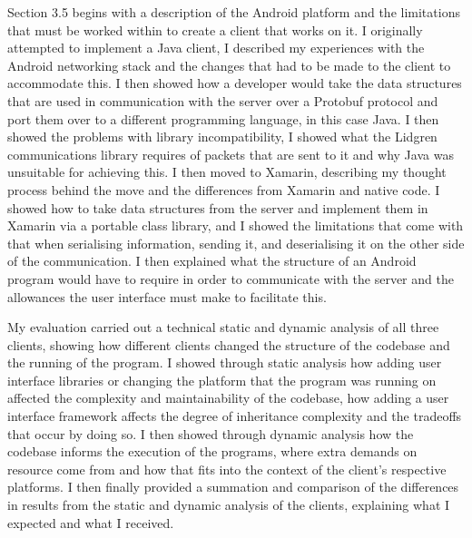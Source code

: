 \documentclass{article}
\begin{document}
Section 3.5 begins with a description of the Android platform and the limitations that must be worked within to create a client that works on it. I originally attempted to implement a Java client, I described my experiences with the Android networking stack and the changes that had to be made to the client to accommodate this. I then showed how a developer would take the data structures that are used in communication with the server over a Protobuf protocol and port them over to a different programming language, in this case Java. I then showed the problems with library incompatibility, I showed what the Lidgren communications library requires of packets that are sent to it and why Java was unsuitable for achieving this. I then moved to Xamarin, describing my thought process behind the move and the differences from Xamarin and native code. I showed how to take data structures from the server and implement them in Xamarin via a portable class library, and I showed the limitations that come with that when serialising information, sending it, and deserialising it on the other side of the communication. I then explained what the structure of an Android program would have to require in order to communicate with the server and the allowances the user interface must make to facilitate this.

My evaluation carried out a technical static and dynamic analysis of all three clients, showing how different clients changed the structure of the codebase and the running of the program. I showed through static analysis how adding user interface libraries or changing the platform that the program was running on affected the complexity and maintainability of the codebase, how adding a user interface framework affects the degree of inheritance complexity and the tradeoffs that occur by doing so. I then showed through dynamic analysis how the codebase informs the execution of the programs, where extra demands on resource come from and how that fits into the context of the client’s respective platforms. I then finally provided a summation and comparison of the differences in results from the static and dynamic analysis of the clients, explaining what I expected and what I received.
\end{document}
